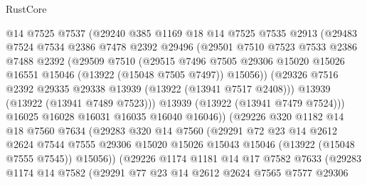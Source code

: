 \begin{lexlean}{RustCore}
\begin{coremodule}
                @14
                @7525
                @7537
                (@29240
                  @385
                  @1169
                  @18
                  @14
                  @7525
                  @7535
                  @2913
                  (@29483
                    @7524
                    @7534
                    @2386
                    @7478
                    @2392
                    @29496
                    (@29501
                      @7510
                      @7523
                      @7533
                      @2386
                      @7488
                      @2392
                      (@29509
                        @7510
                        (@29515
                          @7496
                          @7505
                          @29306
                          @15020
                          @15026
                          @16551
                          @15046
                          (@13922 (@15048 @7505 @7497))
                          @15056))
                      (@29326 @7516 @2392 @29335 @29338 @13939 (@13922 (@13941 @7517 @2408)))
                      @13939
                      (@13922 (@13941 @7489 @7523)))
                    @13939
                    (@13922 (@13941 @7479 @7524)))
                  @16025
                  @16028
                  @16031
                  @16035
                  @16040
                  @16046))
              (@29226
                @320
                @1182
                @14
                @18
                @7560
                @7634
                (@29283
                  @320
                  @14
                  @7560
                  (@29291
                    @72
                    @23
                    @14
                    @2612
                    @2624
                    @7544
                    @7555
                    @29306
                    @15020
                    @15026
                    @15043
                    @15046
                    (@13922 (@15048 @7555 @7545))
                    @15056))
                (@29226
                  @1174
                  @1181
                  @14
                  @17
                  @7582
                  @7633
                  (@29283
                    @1174
                    @14
                    @7582
                    (@29291
                      @77
                      @23
                      @14
                      @2612
                      @2624
                      @7565
                      @7577
                      @29306

\end{coremodule}
\end{lexlean}
